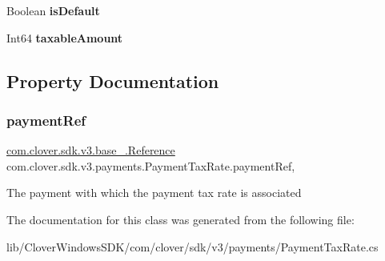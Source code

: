 \begin{DoxyCompactItemize}
Boolean {\bfseries is\+Default}
\item 
\mbox{\label{classcom_1_1clover_1_1sdk_1_1v3_1_1payments_1_1_payment_tax_rate_a8ff57f64008115b286cfe5c17621f23a}} 
Int64 {\bfseries taxable\+Amount}
\end{DoxyCompactItemize}


\subsection{Property Documentation}
\mbox{\label{classcom_1_1clover_1_1sdk_1_1v3_1_1payments_1_1_payment_tax_rate_a8071470577ecf642ac8aefe86e9f4ad6}} 
\subsubsection{\texorpdfstring{payment\+Ref}{paymentRef}}
{\footnotesize\ttfamily \hyperlink{classcom_1_1clover_1_1sdk_1_1v3_1_1base___1_1_reference}{com.\+clover.\+sdk.\+v3.\+base\+\_\+.\+Reference} com.\+clover.\+sdk.\+v3.\+payments.\+Payment\+Tax\+Rate.\+payment\+Ref\hspace{0.3cm}{\ttfamily [get]}, {\ttfamily [set]}}



The payment with which the payment tax rate is associated 



The documentation for this class was generated from the following file\+:\begin{DoxyCompactItemize}
\item 
lib/\+Clover\+Windows\+S\+D\+K/com/clover/sdk/v3/payments/Payment\+Tax\+Rate.\+cs\end{DoxyCompactItemize}
